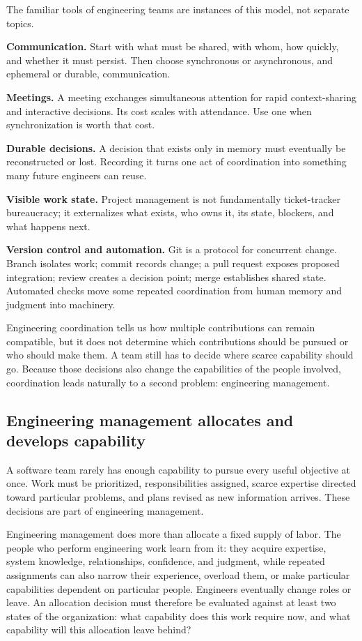 The familiar tools of engineering teams are instances of this model, not separate topics.

\textbf{Communication.} Start with what must be shared, with whom, how quickly, and whether it must
persist. Then choose synchronous or asynchronous, and ephemeral or durable, communication.

\textbf{Meetings.} A meeting exchanges simultaneous attention for rapid context-sharing and interactive
decisions. Its cost scales with attendance. Use one when synchronization is worth that cost.

\textbf{Durable decisions.} A decision that exists only in memory must eventually be reconstructed or
lost. Recording it turns one act of coordination into something many future engineers can reuse.

\textbf{Visible work state.} Project management is not fundamentally ticket-tracker bureaucracy; it
externalizes what exists, who owns it, its state, blockers, and what happens next.

\textbf{Version control and automation.} Git is a protocol for concurrent change. Branch isolates work;
commit records change; a pull request exposes proposed integration; review creates a decision point;
merge establishes shared state. Automated checks move some repeated coordination from human memory
and judgment into machinery.

Engineering coordination tells us how multiple contributions can remain compatible, but it does not
determine which contributions should be pursued or who should make them. A team still has to decide
where scarce capability should go. Because those decisions also change the capabilities of the
people involved, coordination leads naturally to a second problem: engineering management.

\subsection{Engineering management allocates and develops capability}\label{sec-engineering-management}

A software team rarely has enough capability to pursue every useful objective at once. Work must be
prioritized, responsibilities assigned, scarce expertise directed toward particular problems, and
plans revised as new information arrives. These decisions are part of engineering management.

Engineering management does more than allocate a fixed supply of labor. The people who perform
engineering work learn from it: they acquire expertise, system knowledge, relationships, confidence,
and judgment, while repeated assignments can also narrow their experience, overload them, or make
particular capabilities dependent on particular people. Engineers eventually change roles or leave.
An allocation decision must therefore be evaluated against at least two states of the organization:
what capability does this work require now, and what capability will this allocation leave behind?

